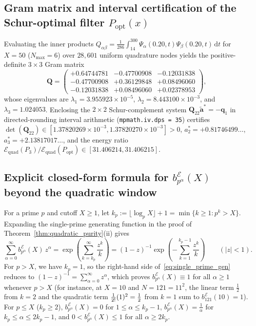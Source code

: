 \documentclass[11pt,reqno]{amsart}
\theoremstyle{definition}
\theoremstyle{remark}
\numberwithin{equation}{section}
\newcommand{\dd}{\mathrm{d}}
\newcommand{\fac}{\mathclose{\mathchar"0021}}
\begin{document}
\subsection{Gram matrix and interval certification of the Schur-optimal filter $P_{\mathrm{opt}}(x)$}\label{app:schur}

Evaluating the inner products $Q_{\alpha\beta} = \frac{1}{286}\int_{14}^{300} \Psi_\alpha(0.20, t)\Psi_\beta(0.20, t)\,\dd t$ for $X = 50$ ($N_{\max} = 6$) over $28{,}601$ uniform quadrature nodes yields the positive-definite $3 \times 3$ Gram matrix
\begin{equation}\label{eq:Q_matrix_explicit}
\mathbf{Q} = \begin{pmatrix}
+0.64744781 & -0.47700908 & -0.12031838 \\
-0.47700908 & +0.36129848 & +0.08496060 \\
-0.12031838 & +0.08496060 & +0.02378953
\end{pmatrix},
\end{equation}
whose eigenvalues are $\lambda_1 = 3.955923 \times 10^{-5}$, $\lambda_2 = 8.443100 \times 10^{-3}$, and $\lambda_3 = 1.024053$. Enclosing the $2 \times 2$ Schur-complement system $\mathbf{Q}_{22}\tilde{\mathbf{a}}^* = -\mathbf{q}_1$ in directed-rounding interval arithmetic (\texttt{mpmath.iv.dps = 35}) certifies $\det(\mathbf{Q}_{22}) \in [1.37820269 \times 10^{-3},\allowbreak 1.37820270 \times 10^{-3}] > 0$, $a_2^* = +0.81746499\dots$, $a_3^* = +2.13817017\dots$, and the energy ratio $\mathcal{E}_{\mathrm{quad}}(P_3)/\allowbreak\mathcal{E}_{\mathrm{quad}}(P_{\mathrm{opt}}) \in [31.406214,\allowbreak 31.406215]$.

\subsection{Explicit closed-form formula for $b_{p^\alpha}^{\mathcal{E}}(X)$ beyond the quadratic window}\label{app:prime_powers}

For a prime $p$ and cutoff $X \ge 1$, let $k_p := \lfloor\log_p X\rfloor + 1 = \min\{k \ge 1 : p^k > X\}$. Expanding the single-prime generating function in the proof of Theorem~\ref{thm:quadratic_purity}(ii) gives
\begin{equation}\label{eq:single_prime_gen}
\sum_{\alpha=0}^{\infty} b_{p^\alpha}^{\mathcal{E}}(X)\,z^\alpha = \exp\!\left(\sum_{k = k_p}^{\infty} \frac{z^k}{k}\right) = (1 - z)^{-1}\exp\!\left(-\sum_{k=1}^{k_p-1} \frac{z^k}{k}\right) \qquad (|z| < 1).
\end{equation}
For $p > X$, we have $k_p = 1$, so the right-hand side of~\eqref{eq:single_prime_gen} reduces to $(1-z)^{-1} = \sum_{\alpha=0}^{\infty} z^\alpha$, which proves $b_{p^\alpha}^{\mathcal{E}}(X) \equiv 1$ for all $\alpha \ge 1$ whenever $p > X$ (for instance, at $X = 10$ and $N = 121 = 11^2$, the linear term $\frac{1}{2}$ from $k = 2$ and the quadratic term $\frac{1}{2\fac}(1)^2 = \frac{1}{2}$ from $k = 1$ sum to $b_{121}^{\mathcal{E}}(10) = 1$). For $p \le X$ ($k_p \ge 2$), $b_{p^\alpha}^{\mathcal{E}}(X) = 0$ for $1 \le \alpha \le k_p - 1$, $b_{p^\alpha}^{\mathcal{E}}(X) = \frac{1}{\alpha}$ for $k_p \le \alpha \le 2k_p - 1$, and $0 < b_{p^\alpha}^{\mathcal{E}}(X) \le 1$ for all $\alpha \ge 2k_p$.
\end{document}
